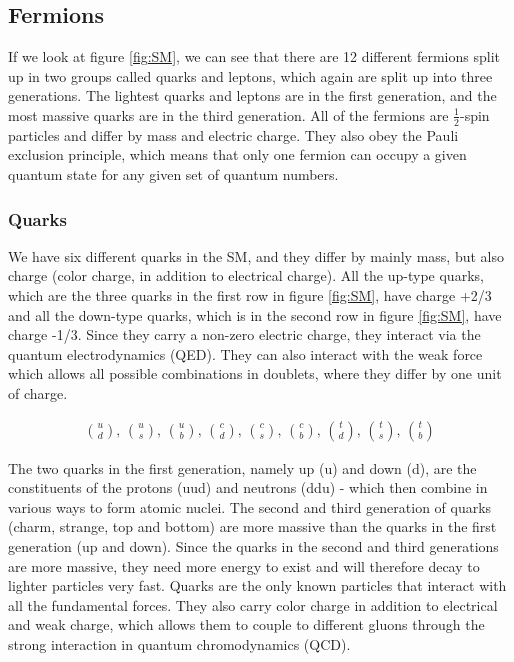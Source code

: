 \subsection{Fermions}
If we look at figure \ref{fig:SM}, we can see that there are 12 different fermions split up in two groups called quarks and leptons, which again are split up into three generations. The lightest quarks and leptons are in the first generation, and the most massive quarks are in the third generation. All of the fermions are $\frac{1}{2}$-spin particles and differ by mass and electric charge. They also obey the Pauli exclusion principle, which means that only one fermion can occupy a given quantum state for any given set of quantum numbers.

\subsubsection{Quarks}
We have six different quarks \cite{thomson} in the SM, and they differ by mainly mass, but also charge (color charge, in addition to electrical charge). All the up-type quarks, which are the three quarks in the first row in figure \ref{fig:SM}, have charge +2/3 and all the down-type quarks, which is in the second row in figure \ref{fig:SM}, have charge -1/3. Since they carry a non-zero electric charge, they interact via the quantum electrodynamics (QED). They can also interact with the weak force which allows all possible combinations in doublets, where they differ by one unit of charge. 

\begin{align}
    \binom{u}{d} \text{,  } \binom{u}{s} \text{,  } \binom{u}{b} \text{,  } \binom{c}{d} \text{,  } \binom{c}{s} \text{,  } \binom{c}{b} \text{,  } \binom{t}{d} \text{,  } \binom{t}{s} \text{,  } \binom{t}{b}
\end{align}

The two quarks in the first generation, namely up (u) and down (d), are the constituents of the protons (uud) and neutrons (ddu) - which then combine in various ways to form atomic nuclei. The second and third generation of quarks (charm, strange, top and bottom) are more massive than the quarks in the first generation (up and down). Since the quarks in the second and third generations are more massive, they need more energy to exist and will therefore decay to lighter particles very fast. Quarks are the only known particles that interact with all the fundamental forces. They also carry color charge in addition to electrical and weak charge, which allows them to couple to different gluons through the strong interaction in quantum chromodynamics (QCD).  


